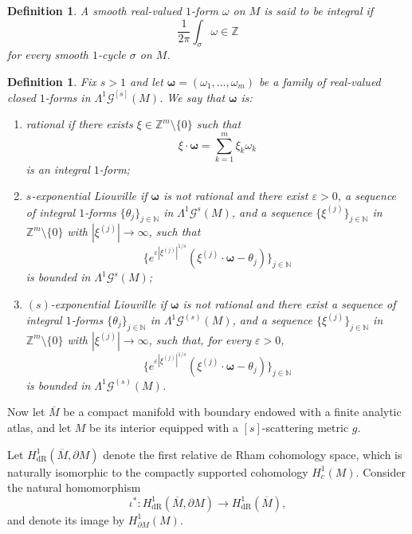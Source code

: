 \documentclass[11pt,reqno]{amsart}
\numberwithin{equation}{section}
\newtheorem{definition}[theorem]{Definition}
\begin{document}
	\begin{definition}
		A smooth real-valued $1$-form $\omega$ on $M$ is said to be \emph{integral} if
		\[
		\frac{1}{2\pi}\int_\sigma \omega \in \mathbb{Z}
		\]
		for every smooth $1$-cycle $\sigma$ on $M$.
	\end{definition}
	
	\begin{definition}
		Fix $s>1$ and let $\boldsymbol{\omega}=(\omega_1,\dots,\omega_m)$ be a family of real-valued closed $1$-forms in $\mathsf{\Lambda}^1\mathscr{G}^{[s]}(M)$. We say that $\boldsymbol{\omega}$ is:
		\begin{enumerate}
			\item \emph{rational} if there exists $\xi\in\mathbb{Z}^m\setminus\{0\}$ such that
			\[
			\xi\cdot\boldsymbol{\omega} = \sum_{k=1}^{m}\xi_k\omega_k
			\]
			is an integral $1$-form;
			
			\item \emph{$s$-exponential Liouville} if $\boldsymbol{\omega}$ is not rational and there exist $\varepsilon>0$, a sequence of integral $1$-forms $\{\theta_j\}_{j\in\mathbb{N}}$ in $\mathsf{\Lambda}^1\mathscr{G}^s(M)$, and a sequence $\{\xi^{(j)}\}_{j\in\mathbb{N}}$ in $\mathbb{Z}^m\setminus\{0\}$ with $|\xi^{(j)}|\to\infty$, such that
			\[
			\big\{e^{\varepsilon|\xi^{(j)}|^{1/s}}(\xi^{(j)}\cdot\boldsymbol{\omega}-\theta_j)\big\}_{j\in\mathbb{N}}
			\]
			is bounded in $\mathsf{\Lambda}^1\mathscr{G}^s(M)$;
			
			\item \emph{$(s)$-exponential Liouville} if $\boldsymbol{\omega}$ is not rational and there exist a sequence of integral $1$-forms $\{\theta_j\}_{j\in\mathbb{N}}$ in $\mathsf{\Lambda}^1\mathscr{G}^{(s)}(M)$, and a sequence $\{\xi^{(j)}\}_{j\in\mathbb{N}}$ in $\mathbb{Z}^m\setminus\{0\}$ with $|\xi^{(j)}|\to\infty$, such that, for every $\varepsilon>0$,
			\[
			\big\{e^{\varepsilon|\xi^{(j)}|^{1/s}}(\xi^{(j)}\cdot\boldsymbol{\omega}-\theta_j)\big\}_{j\in\mathbb{N}}
			\]
			is bounded in $\mathsf{\Lambda}^1\mathscr{G}^{(s)}(M)$.
		\end{enumerate}
	\end{definition}
	
	Now let $\overline{M}$ be a compact manifold with boundary endowed with a finite analytic atlas, and let $M$ be its interior equipped with a ${[s]}$-scattering metric $g$.
	
	Let $H^1_{\mathrm{dR}}(\overline{M},\partial M)$ denote the first relative de Rham cohomology space, which is naturally isomorphic to the compactly supported cohomology $H^1_c(M)$. Consider the natural homomorphism
	\[
	\iota^*: H^1_{\mathrm{dR}}(\overline{M},\partial M)\to H^1_{\mathrm{dR}}(\overline{M}),
	\]
	and denote its image by $H^1_{\partial M}(M)$.
	
\end{document}
